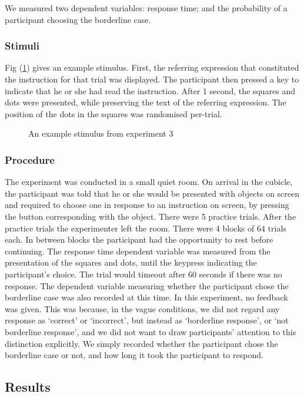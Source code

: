 \documentclass[doc,floatmark]{apa}
\begin{document}
We measured two dependent variables: response time; and the probability of a participant choosing the borderline case.


\subsubsection{Stimuli}
Fig (\ref{stimuluse3}) gives an example stimulus. First, the referring expression that constituted the instruction for that trial was displayed. The participant then pressed a key to indicate that he or she had read the instruction. After 1 second,  the squares and dots were presented, while preserving the text of the referring expression. The position of the dots in the squares was randomised per-trial.

\begin{figure}[tbp]
\caption{An example stimulus from experiment 3}
\label{stimuluse3}
\end{figure}

\subsubsection{Procedure}
The experiment was conducted in a small quiet room.
On arrival in the cubicle, the participant was told that he or she would be presented with objects on screen and required to choose one in response to an instruction on screen, by pressing the button corresponding with the object. There were 5 practice trials. After the practice trials the experimenter left the room. There were 4 blocks of 64 trials each. In between blocks the participant had the opportunity to rest before continuing. The response time dependent variable was measured from the presentation of the squares and dots, until the keypress indicating the participant's choice. The trial would timeout after 60 seconds if there was no response. The dependent variable measuring whether the participant chose the borderline case was also recorded at this time. In this experiment, no feedback was given. This was because, in the vague conditions, we did not regard any response as `correct' or `incorrect', but instead as `borderline response', or `not borderline response', and we did not want to draw participants' attention to this distinction explicitly. We simply recorded whether the participant chose the borderline case or not, and how long it took the participant to respond.

\subsection{Results}
\end{document}
